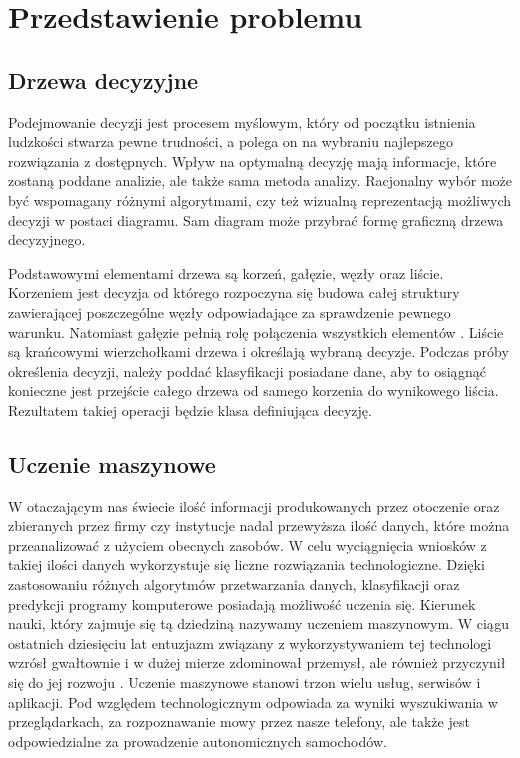 \chapter{Przedstawienie problemu}

\section{Drzewa decyzyjne}

Podejmowanie decyzji jest procesem myślowym, który od początku istnienia ludzkości stwarza pewne trudności, a polega on na wybraniu najlepszego rozwiązania z dostępnych. Wpływ na optymalną decyzję mają informacje, które zostaną poddane analizie, ale także sama metoda analizy. Racjonalny wybór może być wspomagany różnymi algorytmami, czy też wizualną reprezentacją możliwych decyzji w postaci diagramu. Sam diagram może przybrać formę graficzną drzewa decyzyjnego.

Podstawowymi elementami drzewa są korzeń, gałęzie, węzły oraz liście. Korzeniem jest decyzja od którego rozpoczyna się budowa całej struktury zawierającej poszczególne węzły odpowiadające za sprawdzenie pewnego warunku. Natomiast gałęzie pełnią rolę połączenia wszystkich elementów \cite{misc_1}.  Liście są krańcowymi wierzchołkami drzewa i określają wybraną decyzje. Podczas próby określenia decyzji, należy poddać klasyfikacji posiadane dane, aby to osiągnąć konieczne jest przejście całego drzewa od samego korzenia do wynikowego liścia. Rezultatem takiej operacji będzie klasa definiująca decyzję.

\section{Uczenie maszynowe}
W otaczającym nas świecie ilość informacji produkowanych przez otoczenie oraz zbieranych przez firmy czy instytucje nadal przewyższa ilość danych, które można przeanalizować z użyciem obecnych zasobów. W celu wyciągnięcia wniosków z takiej ilości danych wykorzystuje się liczne rozwiązania technologiczne. Dzięki zastosowaniu różnych algorytmów przetwarzania danych, klasyfikacji oraz predykcji programy komputerowe posiadają możliwość uczenia się. Kierunek nauki, który zajmuje się tą dziedziną nazywamy uczeniem maszynowym. W ciągu ostatnich dziesięciu lat entuzjazm związany z wykorzystywaniem tej technologi wzrósł gwałtownie i w dużej mierze 
zdominował przemysł, ale również przyczynił się do jej rozwoju \cite{book_1}. Uczenie maszynowe stanowi trzon wielu usług, serwisów i aplikacji. Pod względem technologicznym odpowiada za wyniki wyszukiwania w przeglądarkach, za rozpoznawanie mowy przez nasze telefony, ale także jest odpowiedzialne za prowadzenie autonomicznych samochodów.

